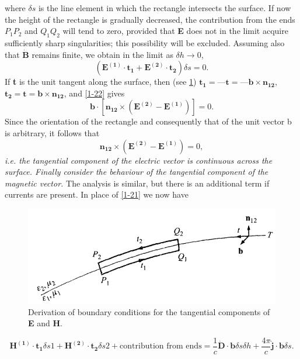 \documentclass[lang=en,11pt]{elegantbook}
\begin{document}
	where $\delta s$ is the line element in which the rectangle intersects the surface. If now the	height of the rectangle is gradually decreased, the contribution from the ends $P_1P_2$ and $Q_1Q_2$ will tend to zero, provided that \textbf{E} does not in the limit acquire sufficiently sharp singularities; this possibility will be excluded. Assuming also that $\mathbf{\dot{B}}$ remains finite, we obtain in the limit as $\delta h\rightarrow0$,
	\begin{equation}
	(\mathbf{E^{(1)}\cdot t_1}+\mathbf{E^{(2)}\cdot t_2})\delta s=0.
	\label{1-22}
	\end{equation}
	If \textbf{t} is the unit tangent along the surface, then (see \ref{fig:1-2}) $\mathbf{t_1}=—\mathbf{t} =—\mathbf{b}\times\mathbf{n_{12}}$, $\mathbf{t_2}=\mathbf{t}=\mathbf{b}\times\mathbf{n_12}$, and \eqref{1-22} gives
	\begin{equation*}
	\mathbf{b}\cdot[\mathbf{n_{12}}\times(\mathbf{E^{(2)}}-\mathbf{E^{(1)}})]=0.
	\end{equation*}
	Since the orientation of the rectangle and consequently that of the unit vector b is arbitrary, it follows that
	\begin{equation}
	\mathbf{n_{12}}\times(\mathbf{E^{(2)}}-\mathbf{E^{(1)}})=0,
	\label{1-23}
	\end{equation}
	\textit{i.e. the tangential component of the electric vector is continuous across the surface. Finally consider the behaviour of the tangential component of the magnetic vector.}
	The analysis is similar, but there is an additional term if currents are present. In place	of \eqref{1-21} we now have
	\begin{figure}[htp!]
		\centering
		\includegraphics[scale=0.5]{image/fig1-2.png}
		\caption{Derivation of boundary conditions for the tangential components of \textbf{E} and \textbf{H}.}
		\label{fig:1-2}
	\end{figure}	
	\begin{equation}
		\mathbf{H^{(1)}\cdot t_1}\delta s1+\mathbf{H^{(2)}\cdot t_2}\delta s2+\text{contribution from ends}=\frac{1}{c}\mathbf{\dot{D}\cdot b}\delta s\delta h+\frac{4\pi}{c}\mathbf{\hat{j}\cdot b}\delta s.
		\label{1-24}
	\end{equation}
\end{document}
